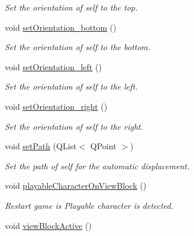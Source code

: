 \begin{DoxyCompactItemize}
\begin{DoxyCompactList}\small\item\em Set the orientation of self to the top. \end{DoxyCompactList}\item 
\hypertarget{class_c___enemy_a5603772a907dea9a4969837d2b73ed0e}{}void \hyperlink{class_c___enemy_a5603772a907dea9a4969837d2b73ed0e}{set\+Orientation\+\_\+bottom} ()\label{class_c___enemy_a5603772a907dea9a4969837d2b73ed0e}

\begin{DoxyCompactList}\small\item\em Set the orientation of self to the bottom. \end{DoxyCompactList}\item 
\hypertarget{class_c___enemy_af4e50d2c9f0f346a9da351d4cdd6fa2d}{}void \hyperlink{class_c___enemy_af4e50d2c9f0f346a9da351d4cdd6fa2d}{set\+Orientation\+\_\+left} ()\label{class_c___enemy_af4e50d2c9f0f346a9da351d4cdd6fa2d}

\begin{DoxyCompactList}\small\item\em Set the orientation of self to the left. \end{DoxyCompactList}\item 
\hypertarget{class_c___enemy_ad2f5268b729e05adee521de5ffb01efc}{}void \hyperlink{class_c___enemy_ad2f5268b729e05adee521de5ffb01efc}{set\+Orientation\+\_\+right} ()\label{class_c___enemy_ad2f5268b729e05adee521de5ffb01efc}

\begin{DoxyCompactList}\small\item\em Set the orientation of self to the right. \end{DoxyCompactList}\item 
\hypertarget{class_c___enemy_a383e552dc387e09be4314520f0da1156}{}void \hyperlink{class_c___enemy_a383e552dc387e09be4314520f0da1156}{set\+Path} (Q\+List$<$ Q\+Point $>$)\label{class_c___enemy_a383e552dc387e09be4314520f0da1156}

\begin{DoxyCompactList}\small\item\em Set the path of self for the automatic displacement. \end{DoxyCompactList}\item 
void \hyperlink{class_c___enemy_a796f1345db2284141b037cdbf6d888d2}{playable\+Character\+On\+View\+Block} ()
\begin{DoxyCompactList}\small\item\em Restart game is Playable character is detected. \end{DoxyCompactList}\item 
\hypertarget{class_c___enemy_aac37e506f7408bd4b3aa0ba82beb853f}{}void \hyperlink{class_c___enemy_aac37e506f7408bd4b3aa0ba82beb853f}{view\+Block\+Active} ()\label{class_c___enemy_aac37e506f7408bd4b3aa0ba82beb853f}


\end{DoxyCompactItemize}
